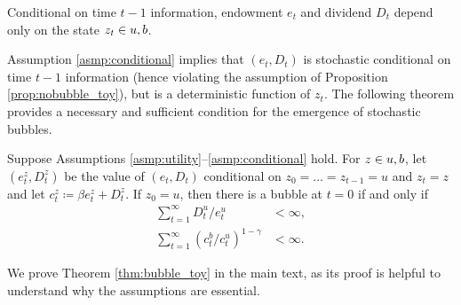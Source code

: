 \documentclass[a4paper,12pt]{article}
\numberwithin{equation}{section}
\theoremstyle{plain}
\begin{document}
\begin{asmp}\label{asmp:conditional}
Conditional on time $t-1$ information, endowment $e_t$ and dividend $D_t$ depend only on the state $z_t\in \set{u,b}$.
\end{asmp}

Assumption \ref{asmp:conditional} implies that $(e_t,D_t)$ is stochastic conditional on time $t-1$ information (hence violating the assumption of Proposition \ref{prop:nobubble_toy}), but is a deterministic function of $z_t$. The following theorem provides a necessary and sufficient condition for the emergence of stochastic bubbles.

\begin{thm}\label{thm:bubble_toy}
Suppose Assumptions \ref{asmp:utility}--\ref{asmp:conditional} hold. For $z\in \set{u,b}$, let $(e_t^z,D_t^z)$ be the value of $(e_t,D_t)$ conditional on $z_0=\dots=z_{t-1}=u$ and $z_t=z$ and let $c_t^z\coloneqq \beta e_t^z+D_t^z$. If $z_0=u$, then there is a bubble at $t=0$ if and only if
\begin{subequations}\label{eq:finite_sum}
\begin{align}
    \sum_{t=1}^\infty D_t^u/e_t^u&<\infty, \label{eq:finite_sum1}\\
    \sum_{t=1}^\infty (c_t^b/c_t^u)^{1-\gamma}&<\infty. \label{eq:finite_sum2}
\end{align}
\end{subequations}
\end{thm}

We prove Theorem \ref{thm:bubble_toy} in the main text, as its proof is helpful to understand why the assumptions are essential.
\end{document}
